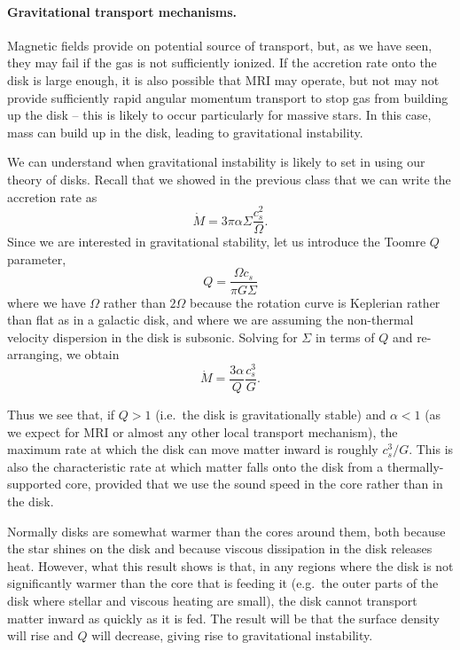 \paragraph{Gravitational transport mechanisms.}

Magnetic fields provide on potential source of transport, but, as we have seen, they may fail if the gas is not sufficiently ionized. If the accretion rate onto the disk is large enough, it is also possible that MRI may operate, but not may not provide sufficiently rapid angular momentum transport to stop gas from building up the disk -- this is likely to occur particularly for massive stars. In this case, mass can build up in the disk, leading to gravitational instability.

We can understand when gravitational instability is likely to set in using our theory of disks. Recall that we showed in the previous class that we can write the accretion rate as
\begin{equation}
\dot{M} = 3\pi \alpha \Sigma \frac{c_s^2}{\Omega}.
\end{equation}
Since we are interested in gravitational stability, let us introduce the Toomre $Q$ parameter,
\begin{equation}
Q = \frac{\Omega c_s}{\pi G \Sigma}
\end{equation}
where we have $\Omega$ rather than $2\Omega$ because the rotation curve is Keplerian rather than flat as in a galactic disk, and where we are assuming the non-thermal velocity dispersion in the disk is subsonic. Solving for $\Sigma$ in terms of $Q$ and re-arranging, we obtain
\begin{equation}
\dot{M} = \frac{3\alpha}{Q} \frac{c_s^3}{G}.
\end{equation}

Thus we see that, if $Q > 1$ (i.e.\ the disk is gravitationally stable) and $\alpha < 1$ (as we expect for MRI or almost any other local transport mechanism), the maximum rate at which the disk can move matter inward is roughly $c_s^3/G$. This is also the characteristic rate at which matter falls onto the disk from a thermally-supported core, provided that we use the sound speed in the core rather than in the disk.

Normally disks are somewhat warmer than the cores around them, both because the star shines on the disk and because viscous dissipation in the disk releases heat. However, what this result shows is that, in any regions where the disk is not significantly warmer than the core that is feeding it (e.g.\ the outer parts of the disk where stellar and viscous heating are small), the disk cannot transport matter inward as quickly as it is fed. The result will be that the surface density will rise and $Q$ will decrease, giving rise to gravitational instability.

